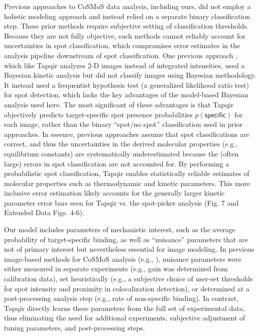 Previous approaches to CoSMoS data analysis, including ours, did not employ a holistic modeling approach and instead relied on a separate binary classification step.  These prior methods require subjective setting of classification thresholds.  Because they are not fully objective, such methods cannot reliably account for uncertainties in spot classification, which compromises error estimates in the analysis pipeline downstream of spot classification. One previous approach \cite{Smith2019-yb,Smith2015-gf}, which like Tapqir analyzes 2-D images instead of integrated intensities, used a Bayesian kinetic analysis but did not classify images using Bayesian methodology. It instead used a frequentist hypothesis test (a generalized likelihood ratio test) for spot detection, which lacks the key advantages of the model-based Bayesian analysis used here.  The most significant of these advantages is that Tapqir objectively predicts target-specific spot presence probabilities $p(\mathsf{specific})$ for each image, rather than the binary ``spot/no spot'' classification used in prior approaches. In essence, previous approaches assume that spot classifications are correct, and thus the uncertainties in the derived molecular properties (e.g., equilibrium constants) are systematically underestimated because the (often large) errors in spot classification are not accounted for. By performing a probabilistic spot classification, Tapqir enables statistically reliable estimates of molecular properties such as thermodynamic and kinetic parameters.  This more inclusive error estimation likely accounts for the generally larger kinetic parameter error bars seen for Tapqir vs. the spot-picker analysis (Fig. 7 and Extended Data Figs. 4-6).

Our model includes parameters of mechanistic interest, such as the average probability of target-specific binding, as well as ``nuisance'' parameters that are not of primary interest but nevertheless essential for image modeling. In previous image-based methods for CoSMoS analysis (e.g., \cite{Friedman2015-nx,Smith2019-yb}), nuisance parameters were either measured in separate experiments (e.g., gain was determined from calibration data), set heuristically (e.g., a subjective choice of user-set thresholds for spot intensity and proximity in colocalization detection), or determined at a post-processing analysis step (e.g., rate of non-specific binding). In contrast, Tapqir directly learns these parameters from the full set of experimental data, thus eliminating the need for additional experiments, subjective adjustment of tuning parameters, and post-processing steps.

